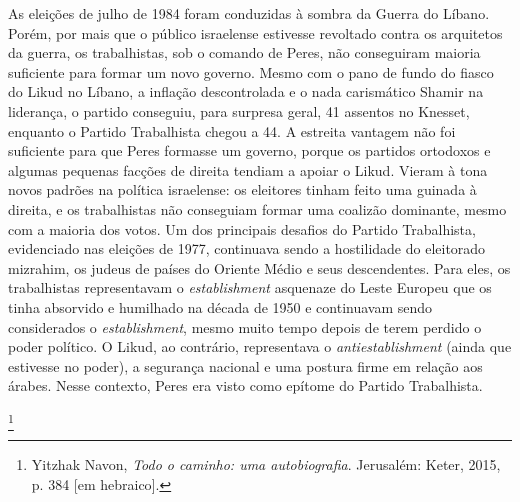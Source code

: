 As eleições de julho de 1984 foram conduzidas à sombra da Guerra do
Líbano. Porém, por mais que o público israelense estivesse revoltado
contra os arquitetos da guerra, os trabalhistas, sob o comando de Peres,
não conseguiram maioria suficiente para formar um novo governo. Mesmo
com o pano de fundo do fiasco do Likud no Líbano, a inflação
descontrolada e o nada carismático Shamir na liderança, o partido
conseguiu, para surpresa geral, 41 assentos no Knesset,
enquanto o Partido Trabalhista chegou a 44. A estreita
vantagem não foi suficiente para que Peres formasse um governo, porque
os partidos ortodoxos e algumas pequenas facções de direita tendiam a
apoiar o Likud. Vieram à tona novos padrões na política israelense: os
eleitores tinham feito uma guinada à direita, e os trabalhistas não
conseguiam formar uma coalizão dominante, mesmo com a maioria dos votos.
Um dos principais desafios do Partido Trabalhista, evidenciado nas
eleições de 1977, continuava sendo a hostilidade do eleitorado
mizrahim, os judeus de países do Oriente Médio e seus descendentes. Para
eles, os trabalhistas representavam o \textit{establishment} asquenaze do
Leste Europeu que os tinha absorvido e humilhado na década de 1950 e
continuavam sendo considerados o \textit{establishment}, mesmo muito tempo depois
de terem perdido o poder político. O Likud, ao contrário, representava o
\textit{antiestablishment} (ainda que estivesse no poder), a segurança nacional e uma
postura firme em relação aos árabes. Nesse contexto, Peres era visto
como epítome do Partido Trabalhista.

\footnote{Yitzhak Navon,
  \textit{Todo o caminho: uma autobiografia}. Jerusalém: Keter, 2015, p. 384
  {[}em hebraico{]}.}

